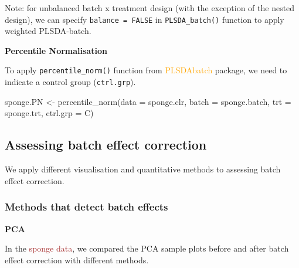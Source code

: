 \documentclass[
]{book}
\newenvironment{Shaded}{\begin{snugshade}}{\end{snugshade}}
\newcommand{\AttributeTok}[1]{\textcolor[rgb]{0.77,0.63,0.00}{#1}}
\newcommand{\FunctionTok}[1]{\textcolor[rgb]{0.00,0.00,0.00}{#1}}
\newcommand{\NormalTok}[1]{#1}
\newcommand{\OtherTok}[1]{\textcolor[rgb]{0.56,0.35,0.01}{#1}}
\newcommand{\StringTok}[1]{\textcolor[rgb]{0.31,0.60,0.02}{#1}}
\begin{document}
Note: for unbalanced batch x treatment design (with the exception of the nested design), we can specify \texttt{balance\ =\ FALSE} in \texttt{PLSDA\_batch()} function to apply weighted PLSDA-batch.

\textbf{Percentile Normalisation}

To apply \texttt{percentile\_norm()} function from \textcolor{orange}{PLSDAbatch} package, we need to indicate a control group (\texttt{ctrl.grp}).

\begin{Shaded}
\begin{Highlighting}[]
\NormalTok{sponge.PN }\OtherTok{\textless{}{-}} \FunctionTok{percentile\_norm}\NormalTok{(}\AttributeTok{data =}\NormalTok{ sponge.clr, }
                             \AttributeTok{batch =}\NormalTok{ sponge.batch, }
                             \AttributeTok{trt =}\NormalTok{ sponge.trt, }
                             \AttributeTok{ctrl.grp =} \StringTok{\textquotesingle{}C\textquotesingle{}}\NormalTok{)}
\end{Highlighting}
\end{Shaded}

\hypertarget{assessing-batch-effect-correction-1}{%
\subsection{Assessing batch effect correction}\label{assessing-batch-effect-correction-1}}

We apply different visualisation and quantitative methods to assessing batch effect correction.

\hypertarget{methods-that-detect-batch-effects-1}{%
\subsubsection{Methods that detect batch effects}\label{methods-that-detect-batch-effects-1}}

\textbf{PCA}

In the \textcolor{brown}{sponge data}, we compared the PCA sample plots before and after batch effect correction with different methods.
\end{document}
